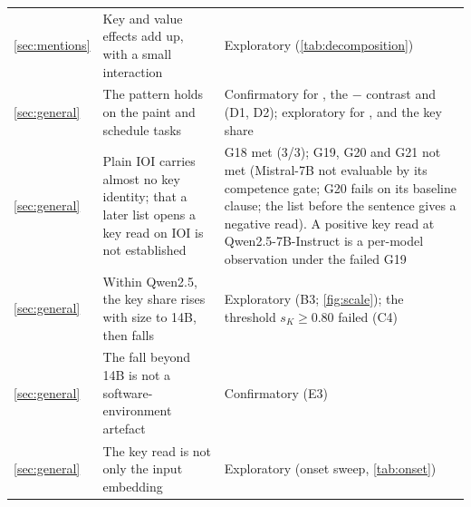 \begin{table}[p]
\begin{tabular}{p{}p{}p{}}
\cref{sec:mentions} & Key and value effects add up, with a small interaction & Exploratory (\cref{tab:decomposition}) \\
\cref{sec:general} & The pattern holds on the paint and schedule tasks & Confirmatory for \fmtOpt{}, the \fmtOpt{} $-$ \fmtNone{} contrast and \fmtBefore{} (D1, D2); exploratory for \fmtPost{}, \fmtLetter{} and the key share \\
\cref{sec:general} & Plain IOI carries almost no key identity; that a later list opens a key read on IOI is not established & G18 met (3/3); G19, G20 and G21 not met (Mistral-7B not evaluable by its competence gate; G20 fails on its baseline clause; the list before the sentence gives a negative read). A positive key read at Qwen2.5-7B-Instruct is a per-model observation under the failed G19 \\
\cref{sec:general} & Within Qwen2.5, the \fmtOpt{} key share rises with size to 14B, then falls & Exploratory (B3; \cref{fig:scale}); the threshold $s_K \geq 0.80$ failed (C4) \\
\cref{sec:general} & The fall beyond 14B is not a software-environment artefact & Confirmatory (E3) \\
\cref{sec:general} & The key read is not only the input embedding & Exploratory (onset sweep, \cref{tab:onset}) \\
\bottomrule
\end{tabular}
\end{table}

